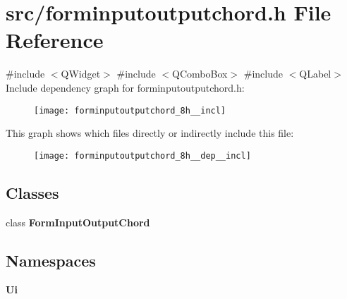 \section{src/forminputoutputchord.h File Reference}
\label{forminputoutputchord_8h}
{\ttfamily \#include $<$Q\+Widget$>$}\newline
{\ttfamily \#include $<$Q\+Combo\+Box$>$}\newline
{\ttfamily \#include $<$Q\+Label$>$}\newline
Include dependency graph for forminputoutputchord.\+h\+:\nopagebreak
\begin{figure}[H]
\begin{center}
\leavevmode
\texttt{[image: forminputoutputchord\_8h\_\_incl]}
\end{center}
\end{figure}
This graph shows which files directly or indirectly include this file\+:\nopagebreak
\begin{figure}[H]
\begin{center}
\leavevmode
\texttt{[image: forminputoutputchord\_8h\_\_dep\_\_incl]}
\end{center}
\end{figure}
\subsection*{Classes}
\begin{DoxyCompactItemize}
\item 
class \textbf{ Form\+Input\+Output\+Chord}
\end{DoxyCompactItemize}
\subsection*{Namespaces}
\begin{DoxyCompactItemize}
\item 
 \textbf{ Ui}
\end{DoxyCompactItemize}
